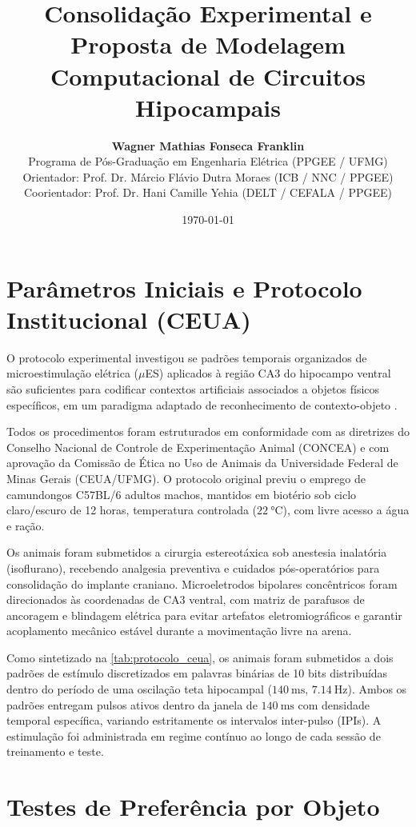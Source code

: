 \documentclass[11pt,a4paper,article,brazil]{abntex2}
\title{\textbf{Consolidação Experimental e Proposta de Modelagem Computacional de Circuitos Hipocampais}}
\author{\textbf{Wagner Mathias Fonseca Franklin}\\[0.2em]
\small Programa de Pós-Graduação em Engenharia Elétrica (PPGEE / UFMG)\\[0.1em]
\small Orientador: Prof. Dr. Márcio Flávio Dutra Moraes (ICB / NNC / PPGEE)\\[0.1em]
\small Coorientador: Prof. Dr. Hani Camille Yehia (DELT / CEFALA / PPGEE)}
\date{\today}
\begin{document}
\maketitle

\section{Parâmetros Iniciais e Protocolo Institucional (CEUA)}

O protocolo experimental investigou se padrões temporais organizados de microestimulação elétrica ($\mu$ES) aplicados à região CA3 do hipocampo ventral são suficientes para codificar contextos artificiais associados a objetos físicos específicos, em um paradigma adaptado de reconhecimento de contexto-objeto \cite{dix1999}.

Todos os procedimentos foram estruturados em conformidade com as diretrizes do Conselho Nacional de Controle de Experimentação Animal (CONCEA) e com aprovação da Comissão de Ética no Uso de Animais da Universidade Federal de Minas Gerais (CEUA/UFMG). O protocolo original previu o emprego de camundongos C57BL/6 adultos machos, mantidos em biotério sob ciclo claro/escuro de 12 horas, temperatura controlada ($\qty{22}{\degreeCelsius}$), com livre acesso a água e ração.

Os animais foram submetidos a cirurgia estereotáxica sob anestesia inalatória (isoflurano), recebendo analgesia preventiva e cuidados pós-operatórios para consolidação do implante craniano. Microeletrodos bipolares concêntricos foram direcionados às coordenadas de CA3 ventral, com matriz de parafusos de ancoragem e blindagem elétrica para evitar artefatos eletromiográficos e garantir acoplamento mecânico estável durante a movimentação livre na arena.

Como sintetizado na \cref{tab:protocolo_ceua}, os animais foram submetidos a dois padrões de estímulo discretizados em palavras binárias de 10 bits distribuídas dentro do período de uma oscilação teta hipocampal ($\qty{140}{\milli\second}$, $\qty{7.14}{\hertz}$). Ambos os padrões entregam pulsos ativos dentro da janela de $\qty{140}{\milli\second}$ com densidade temporal específica, variando estritamente os intervalos inter-pulso (IPIs). A estimulação foi administrada em regime contínuo ao longo de cada sessão de treinamento e teste.




\section{Testes de Preferência por Objeto}
\end{document}
